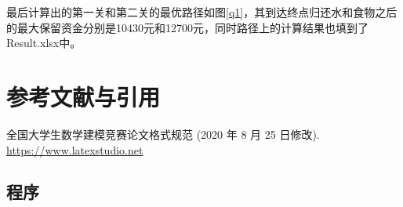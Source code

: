 \documentclass[withoutpreface,bwprint]{cumcmthesis} %
\begin{document}
最后计算出的第一关和第二关的最优路径如图\ref{q1}，其到达终点归还水和食物之后的最大保留资金分别是10430元和12700元，同时路径上的计算结果也填到了Result.xlsx中。






\section{参考文献与引用}

\begin{thebibliography}{9}%
    全国大学生数学建模竞赛论文格式规范 (2020 年 8 月 25 日修改).
     \url{https://www.latexstudio.net}
\end{thebibliography}

\newpage
\begin{appendices}

\section{程序}

\begin{lstlisting}[language=matlab]

\end{lstlisting}

\end{appendices}
\end{document}
